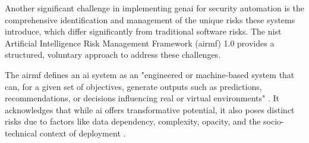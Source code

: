 \newpage

Another significant challenge in implementing \gls{genai} for security automation is the comprehensive identification and management of the unique risks these systems introduce, which differ significantly from traditional software risks. The \gls{nist} Artificial Intelligence Risk Management Framework (\gls{airmf}) 1.0 \cite{tabassi_artificial_2023} provides a structured, voluntary approach to address these challenges.

The \gls{airmf} defines an \gls{ai} system as an "engineered or machine-based system that can, for a given set of objectives, generate outputs such as predictions, recommendations, or decisions influencing real or virtual environments" \cite[p.1]{tabassi_artificial_2023}. It acknowledges that while \gls{ai} offers transformative potential, it also poses distinct risks due to factors like data dependency, complexity, opacity, and the socio-technical context of deployment \cite{tabassi_artificial_2023}.

